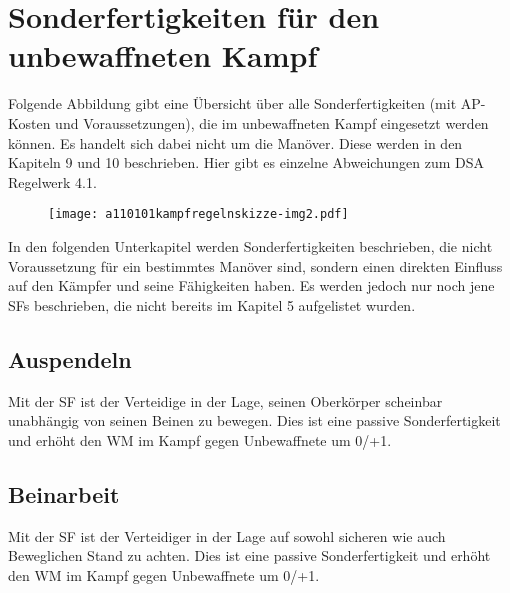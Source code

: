 %


\section[Sonderfertigkeiten für den unbewaffneten Kampf]{\color{black}
Sonderfertigkeiten für den unbewaffneten Kampf}
{\sffamily\color{black}
Folgende Abbildung gibt eine Übersicht über alle Sonderfertigkeiten (mit
AP-Kosten und Voraussetzungen), die im unbewaffneten Kampf eingesetzt
werden können. Es handelt sich dabei nicht um die Manöver. Diese werden
in den Kapiteln 9 und 10 beschrieben. Hier gibt es einzelne
Abweichungen zum DSA Regelwerk 4.1.}


\bigskip



\begin{figure}
\centering
\texttt{[image: a110101kampfregelnskizze-img2.pdf]}
\end{figure}
{\sffamily\color{black}
In den folgenden Unterkapitel werden Sonderfertigkeiten beschrieben, die
nicht Voraussetzung für ein bestimmtes Manöver sind, sondern einen
direkten Einfluss auf den Kämpfer und seine Fähigkeiten haben. Es
werden jedoch nur noch jene SFs beschrieben, die nicht bereits im
Kapitel 5 aufgelistet wurden.}

\subsection[Auspendeln (Raufen oder Ringen)]{Auspendeln
}
{\sffamily\color{black}
Mit der SF  ist der Verteidige in der
Lage, seinen Oberkörper scheinbar unabhängig von seinen Beinen zu
bewegen. Dies ist eine passive Sonderfertigkeit und erhöht den WM im
Kampf gegen Unbewaffnete um 0/+1.}

\subsection[Beinarbeit (Raufen oder Ringen)]{Beinarbeit
}
{\sffamily\color{black}
Mit der SF  ist der Verteidiger in der
Lage auf sowohl sicheren wie auch Beweglichen Stand zu achten. Dies ist
eine passive Sonderfertigkeit und erhöht den WM im Kampf gegen
Unbewaffnete um 0/+1.}

